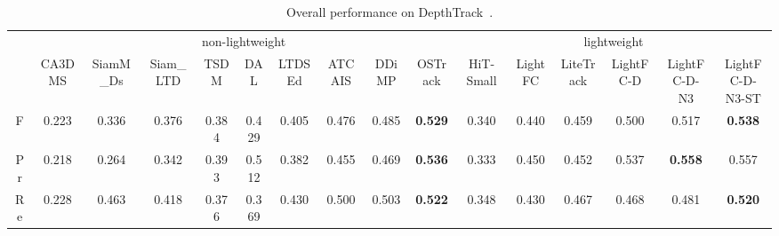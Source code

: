 \begin{table*}[t]
\centering
\footnotesize
\renewcommand{\arraystretch}{1.05}
\setlength{\tabcolsep}{0.8pt}
\begin{tabular}{c|ccccccccc|cccccc}
\hline
\multirow{2}{*}{} & \multicolumn{9}{c|}{non-lightweight}                                               & \multicolumn{6}{c}{lightweight}                                              \\ \cline{2-16} 
                  & \thead{CA3DMS \\~\cite{CA3DMS}} & \thead{SiamM\_Ds \\~\cite{vot19}} & \thead{Siam\_LTD \\~\cite{vot20}} & \thead{TSDM \\~\cite{tsdm}}  & \thead{DAL \\~\cite{DAL} }   & \thead{LTDSEd \\~\cite{vot19}} & \thead{ATCAIS \\~\cite{vot20}} & \thead{DDiMP \\~\cite{vot20}} & \thead{OSTrack \\~\cite{ostrack}} & \thead{HiT-Small \\~\cite{hit}} & \thead{LightFC \\~\cite{lightfc}} & \thead{LiteTrack \\~\cite{litetrack}} & \thead{LightFC-D \\ \ } & \thead{LightFC-D- \\N3} & \thead{LightFC-D- \\N3-ST} \\ \hline
F                 & 0.223  & 0.336     & 0.376     & 0.384 & 0.429 & 0.405  & 0.476  & 0.485 & \color{red}\textbf{0.529}   & 0.340     & 0.440   & 0.459     & 0.500     & 0.517 & \color{blue}\textbf{0.538} \\
Pr                & 0.218  & 0.264     & 0.342     & 0.393 & 0.512 & 0.382  & 0.455  & 0.469 & \color{red}\textbf{0.536}   & 0.333     & 0.450   & 0.452     & 0.537     & \color{blue}\textbf{0.558} & 0.557 \\
Re                & 0.228  & 0.463     & 0.418     & 0.376 & 0.369 & 0.430  & 0.500  & 0.503 & \color{red}\textbf{0.522}   & 0.348     & 0.430   & 0.467     & 0.468     & 0.481 & \color{blue}\textbf{0.520} \\ \hline
\end{tabular}

\caption{Overall performance on DepthTrack~\cite{depthtrack}. 
}
\label{table rgbd depthtrack}

\end{table*}